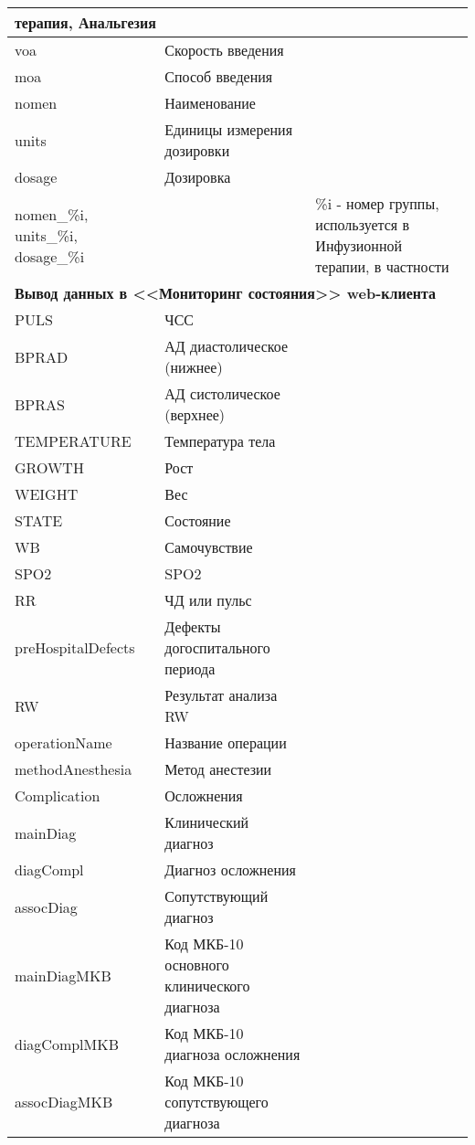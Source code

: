 {\begin{longtable}{|p{4.1cm}|p{7.6cm}|p{5cm}|}
\multicolumn{3}{|l|}{\textbf{терапия, Анальгезия}} \\ \hline	
voa	& Скорость введения &  \\ \hline		
moa	& Способ введения	&  \\ \hline	
nomen	& Наименование &  \\ \hline		
units	& Единицы измерения дозировки	&  \\ \hline	
dosage	& Дозировка	&  \\ \hline	
nomen\_\%i, units\_\%i, dosage\_\%i	& &	\%i - номер группы, используется в Инфузионной терапии, в частности  \\ \hline	
\multicolumn{3}{|l|}{\textbf{Вывод данных в <<Мониторинг состояния>> web-клиента}}  \\ \hline
PULS &	ЧСС &  \\ \hline	
BPRAD	& АД диастолическое (нижнее) &  \\ \hline	
BPRAS	& АД систолическое (верхнее) &  \\ \hline	
TEMPERATURE	& Температура тела &  \\ \hline	
GROWTH 	& Рост  &  \\ \hline	
WEIGHT	& Вес	&  \\ \hline
STATE	& Состояние &  \\ \hline	
WB	& Самочувствие &  \\ \hline	
SPO2 & 	SPO2 &  \\ \hline	
RR	& ЧД или пульс &  \\ \hline	
preHospitalDefects & Дефекты догоспитального периода	 &  \\ \hline
RW	& Результат анализа RW &  \\ \hline	
operationName	& Название операции &  \\ \hline	
methodAnesthesia	& Метод анестезии &  \\ \hline	
Complication	& Осложнения &  \\ \hline	
mainDiag	& Клинический диагноз &  \\ \hline	
diagCompl	& Диагноз осложнения &  \\ \hline	
assocDiag	& Сопутствующий диагноз	&  \\ \hline
mainDiagMKB	& Код МКБ-10 основного клинического диагноза	&  \\ \hline
diagComplMKB & 	Код МКБ-10 диагноза осложнения &  \\ \hline	
assocDiagMKB & 	Код МКБ-10 сопутствующего диагноза &  \\ \hline	
\end{longtable}
}

